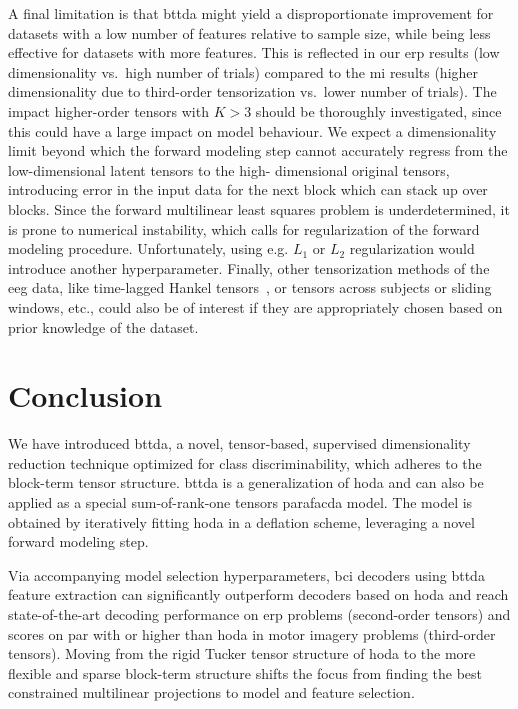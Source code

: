 \documentclass[twocolumn]{article}
\begin{document}
	A final limitation is that \ac{bttda} might yield a disproportionate
	improvement for datasets with a low number of features relative to sample size,
	while being less effective for datasets with more features.
	This is reflected in our \ac{erp} results (low dimensionality vs.\ high number of
	trials) compared to the \ac{mi} results (higher dimensionality due to third-order
	tensorization vs.\ lower number of trials).
	The impact higher-order tensors with $K>3$ should be thoroughly
	investigated, since this could have a large impact on model behaviour.
	We expect a dimensionality limit beyond which the forward modeling step cannot
	accurately regress from the low-dimensional latent tensors to the high-
	dimensional original tensors, introducing
	error in the input data for the next block which can stack up over blocks.
	Since the forward multilinear least squares problem is underdetermined, it is
	prone to numerical instability, which calls for regularization of the forward
	modeling procedure.
	Unfortunately, using e.g. $L_1$ or $L_2$ regularization would introduce another
hyperparameter.
Finally, other tensorization methods of the \ac{eeg} data, like time-lagged Hankel
tensors~\cite{Papy2005}, or tensors across subjects or sliding windows, etc.,
could also be of interest if they are appropriately chosen based on prior
knowledge of the dataset.

\section{Conclusion}

We have introduced \acf{bttda}, a novel,
tensor-based, supervised dimensionality reduction technique optimized for class
discriminability, which adheres to the block-term tensor structure.
\ac{bttda} is a generalization of \acf{hoda} and can also be
applied as a special sum-of-rank-one tensors \ac{parafacda} model.
The model is obtained by iteratively fitting \ac{hoda} in a deflation scheme,
leveraging a novel forward modeling step.

Via accompanying model selection hyperparameters, \ac{bci} decoders using
\ac{bttda} feature extraction can significantly outperform decoders based on
\ac{hoda} and reach state-of-the-art decoding performance on \acl{erp} problems (second-order tensors) and scores on par with or higher than \ac{hoda} in motor imagery problems (third-order tensors).
Moving from the rigid Tucker tensor structure of \ac{hoda} to the more flexible
and sparse block-term structure shifts the focus from finding the best constrained
multilinear projections to model and feature selection.
\end{document}
